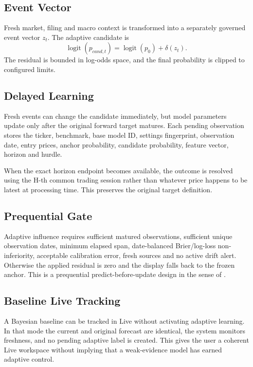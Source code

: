 \documentclass[11pt]{article}
\newcommand{\logit}{\operatorname{logit}}
\begin{document}
\subsection{Event Vector}
Fresh market, filing and macro context is transformed into a separately governed event vector $z_t$. The adaptive candidate is
\begin{equation}
\logit(p_{cand,t})=\logit(p_0)+\delta(z_t).
\end{equation}
The residual is bounded in log-odds space, and the final probability is clipped to configured limits.

\subsection{Delayed Learning}
Fresh events can change the candidate immediately, but model parameters update only after the original forward target matures. Each pending observation stores the ticker, benchmark, base model ID, settings fingerprint, observation date, entry prices, anchor probability, candidate probability, feature vector, horizon and hurdle.

When the exact horizon endpoint becomes available, the outcome is resolved using the H-th common trading session rather than whatever price happens to be latest at processing time. This preserves the original target definition.

\subsection{Prequential Gate}
Adaptive influence requires sufficient matured observations, sufficient unique observation dates, minimum elapsed span, date-balanced Brier/log-loss non-inferiority, acceptable calibration error, fresh sources and no active drift alert. Otherwise the applied residual is zero and the display falls back to the frozen anchor. This is a prequential predict-before-update design in the sense of \citet{dawid1984prequential}.

\subsection{Baseline Live Tracking}
A Bayesian baseline can be tracked in Live without activating adaptive learning. In that mode the current and original forecast are identical, the system monitors freshness, and no pending adaptive label is created. This gives the user a coherent Live workspace without implying that a weak-evidence model has earned adaptive control.
\end{document}
